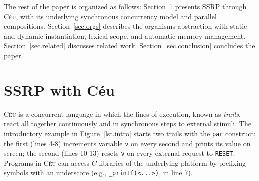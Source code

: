 \documentclass{sigplanconf}
\newcommand{\CEU}{\textsc{C\'{e}u}\xspace}
\newcommand{\code}[1] {{\small{\texttt{#1}}}}
\newcommand{\1}{\;}
\newcommand{\2}{\;\;}
\newcommand{\3}{\;\;\;}
\newcommand{\5}{\;\;\;\;\;}
\begin{document}

The rest of the paper is organized as follows:
Section~\ref{sec.ceu} presents SSRP through \CEU, with its underlying 
synchronous concurrency model and parallel compositions.
Section~\ref{sec.orgs} describes the organisms abstraction with static and 
dynamic instantiation, lexical scope, and automatic memory management.
Section~\ref{sec.related} discusses related work.
Section~\ref{sec.conclusion} concludes the paper.

\section{SSRP with C\'eu}
\label{sec.ceu}

\CEU is a concurrent language in which the lines of execution, known as 
\emph{trails}, react all together continuously and in synchronous steps to 
external stimuli.
%
%
The introductory example in Figure~\ref{lst.intro} starts two trails with the 
\code{par} construct: the first (lines 4-8) increments variable \code{v} on 
every second and prints its value on screen; the second (lines 10-13) resets 
\code{v} on every external request to \code{RESET}.
%
%
Programs in \CEU can access $C$ libraries of the underlying platform by 
prefixing symbols with an underscore (e.g., \code{\_printf(<...>)}, in line 7).
\end{document}
